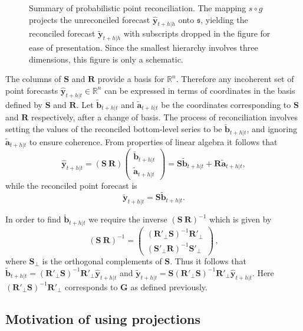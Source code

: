 \documentclass[12pt]{article}
\theoremstyle{definition}
\begin{document}
	
	\begin{figure}
		
		\caption{Summary of probabilistic point reconciliation. The mapping $s\circ g$ projects the unreconciled forecast $\hat{\bm{y}}_{t+h|h}$ onto $\mathfrak{s}$, yielding the reconciled forecast $\tilde{\bm{y}}_{t+h|h}$ with subscripts dropped in the figure for ease of presentation. Since the smallest hierarchy involves three dimensions, this figure is only a schematic.}\label{fig:pointfr_sch}
	\end{figure}
	
	The columns of $\bm{S}$ and $\bm{R}$ provide a basis for $\mathbb{R}^n$. Therefore any incoherent set of point forecasts $\hat{\bm{y}}_{t+h|t} \in \mathbb{R}^n$ can be expressed in terms of coordinates in the basis defined by $\bm{S}$ and $\bm{R}$. Let $\tilde{\bm{b}}_{t+h|t}$ and $\tilde{\bm{a}}_{t+h|t}$ be the coordinates corresponding to $\bm{S}$ and $\bm{R}$ respectively, after a change of basis. The process of reconciliation involves setting the values of the reconciled bottom-level series to be $\tilde{\bm{b}}_{t+h|t}$, and ignoring $\tilde{\bm{a}}_{t+h|t}$ to ensure coherence. From properties of linear algebra it follows that
	\[
	\hat{\bm{y}}_{t+h|t} = (\bm{S} ~ \bm{R})
	\begin{pmatrix}
	\tilde{\bm{b}}_{t+h|t}\\ \tilde{\bm{a}}_{t+h|t}
	\end{pmatrix}= \bm{S}\tilde{\bm{b}}_{t+h|t} + \bm{R}\tilde{\bm{a}}_{t+h|t},
	\]
	while the reconciled point forecast is
	\[
	\tilde{\bm{y}}_{t+h|t} = \bm{S}\tilde{\bm{b}}_{t+h|t}.
	\]
	
	
	In order to find $\tilde{\bm{b}}_{t+h|t}$ we require the inverse $(\bm{S} ~ \bm{R})^{-1}$ which is given by
	\begin{equation}
	(\bm{S} ~ \bm{R})^{-1} = \begin{pmatrix}
	(\bm{R}'_\bot \bm{S})^{-1}\bm{R}'_\bot \\ (\bm{S}'_\bot \bm{R})^{-1}\bm{S}'_\bot
	\end{pmatrix}\,,
	\end{equation}
	where $\bm{S}_{\bot}$ is the orthogonal complements of $\bm{S}$. Thus it follows that $\tilde{\bm{b}}_{t+h|t}=(\bm{R}'_\bot \bm{S})^{-1}\bm{R}'_\bot \hat{\bm{y}}_{t+h|t}$ and $\tilde{\bm{y}}_{t+h|t}=\bm{S}(\bm{R}'_\bot \bm{S})^{-1}\bm{R}'_\bot \hat{\bm{y}}_{t+h|t}$. Here $(\bm{R}'_\bot \bm{S})^{-1}\bm{R}'_\bot$ corresponds to $\bm{G}$ as defined previously.
	
	\subsection{Motivation of using projections}
	
\end{document}
